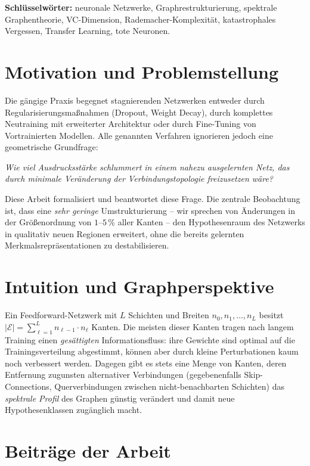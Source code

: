 \documentclass[12pt, a4paper, openany]{report}
\newcommand{\calE}{\mathcal{E}}
\begin{document}
\textbf{Schlüsselwörter:} neuronale Netzwerke, Graphrestrukturierung,
spektrale Graphentheorie, VC-Dimension, Rademacher-Komplexität,
katastrophales Vergessen, Transfer Learning, tote Neuronen.

\section{Motivation und Problemstellung}

Die gängige Praxis begegnet stagnierenden Netzwerken entweder durch
Regularisierungsmaßnahmen (Dropout, Weight Decay), durch komplettes
Neutraining mit erweiterter Architektur oder durch Fine-Tuning von
Vortrainierten Modellen.  Alle genannten Verfahren ignorieren jedoch eine
geometrische Grundfrage:

\begin{center}
\itshape
Wie viel Ausdrucksstärke schlummert in einem nahezu ausgelernten Netz,
das durch minimale Veränderung der Verbindungstopologie freizusetzen wäre?
\end{center}

Diese Arbeit formalisiert und beantwortet diese Frage.  Die zentrale
Beobachtung ist, dass eine \emph{sehr geringe} Umstrukturierung -- wir
sprechen von Änderungen in der Größenordnung von $1$--$5\,\%$ aller Kanten --
den Hypothesenraum des Netzwerks in qualitativ neuen Regionen erweitert, ohne
die bereits gelernten Merkmalsrepräsentationen zu destabilisieren.

\section{Intuition und Graphperspektive}

Ein Feedforward-Netzwerk mit $L$ Schichten und Breiten $n_0, n_1, \ldots, n_L$
besitzt $|\calE| = \sum_{\ell=1}^L n_{\ell-1}\cdot n_\ell$ Kanten.  Die
meisten dieser Kanten tragen nach langem Training einen
\emph{gesättigten} Informationsfluss: ihre Gewichte sind optimal auf die
Trainingsverteilung abgestimmt, können aber durch kleine Perturbationen kaum
noch verbessert werden.  Dagegen gibt es stets eine Menge von Kanten, deren
Entfernung zugunsten alternativer Verbindungen (gegebenenfalls Skip-Connections,
Querverbindungen zwischen nicht-benachbarten Schichten) das
\emph{spektrale Profil} des Graphen günstig verändert und damit neue
Hypothesenklassen zugänglich macht.

\section{Beiträge der Arbeit}
\end{document}
